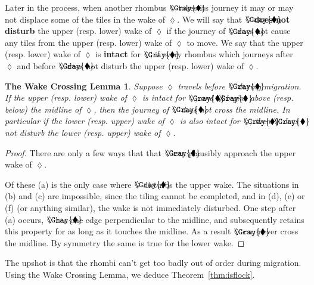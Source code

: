 \documentclass[12pt]{article}
\newcommand{\graylozenge}{\begin{picture}(0,0)(0,0)\put(0,0){$\Gray{\blacklozenge}$}\end{picture}\nolinebreak\lozenge}
\newtheorem*{wclemma}{The Wake Crossing Lemma}
\begin{document}
Later in the process, when another rhombus $\graylozenge$ takes
its journey it may or may not displace some of the tiles in the 
wake of $\lozenge$.  We will say that $\graylozenge$
{\bf does not disturb} the upper (resp. lower) wake of $\lozenge$
if the journey of $\graylozenge$ does not cause any tiles from
the upper (resp. lower) wake of $\lozenge$ to move.  
We say that the upper (resp. lower) wake of $\lozenge$ is
{\bf intact} for $\graylozenge$, if every rhombus which journeys
after $\lozenge$ and before $\graylozenge$ does not disturb the
upper (resp. lower) wake of $\lozenge$.  

\begin{wclemma}
Suppose $\lozenge$ travels before $\graylozenge$ during migration.
If the upper (resp. lower) wake of $\lozenge$ is intact for 
$\graylozenge$, and $\graylozenge$ begins above (resp. below) the midline 
of $\lozenge$, then the journey of $\graylozenge$ does not cross
the midline.  In particular if the lower (resp. upper) wake
of $\lozenge$ is also intact for $\graylozenge$, then $\graylozenge$
does not disturb the lower (resp. upper) wake of $\lozenge$.
\end{wclemma}

\begin{proof}
There are only a few ways that 
that $\graylozenge$ can plausibly approach the upper wake 
of $\lozenge$.
\begin{center}
\end{center}
Of these (a) is the only case where $\graylozenge$ disturbs the
upper wake.  The situations in (b) and (c) are impossible, since
the tiling cannot be completed, and in (d), (e) or (f) (or anything
similar), the wake is not immediately disturbed.
One step after (a) occurs, $\graylozenge$ has one edge perpendicular
to the midline, and subsequently retains this property for as long as 
it touches the midline.  As a result $\graylozenge$
can never cross the midline. By symmetry the same is true for the lower wake.
\end{proof}

The upshot is that the rhombi can't get too badly out
of order during migration.  Using the Wake Crossing Lemma,
we deduce Theorem~\ref{thm:isflock}.
\end{document}
